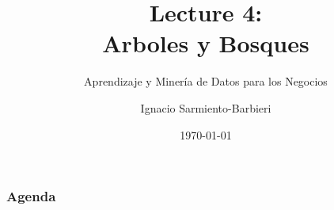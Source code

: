 \documentclass[
  shownotes,
  xcolor={svgnames},
  hyperref={colorlinks,citecolor=DarkBlue,linkcolor=DarkRed,urlcolor=DarkBlue}
  , aspectratio=169]{beamer}
\begin{document}
\title[Lecture 4]{Lecture 4: \\ Arboles y Bosques}
\subtitle{Aprendizaje y Minería de Datos para los Negocios}
\date{\today}

\author[Sarmiento-Barbieri]{Ignacio Sarmiento-Barbieri}


\begin{frame}[noframenumbering]
\maketitle
\end{frame}





\begin{frame}
\frametitle{Agenda}

\tableofcontents

\end{frame}


\end{document}
